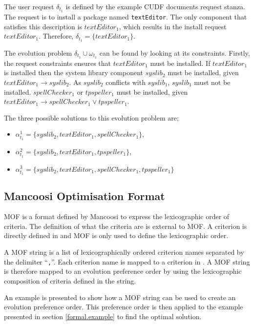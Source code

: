 The user request $\delta_{t_1}$ is defined by the example CUDF documents request stanza.
The request is to install a package named \texttt{textEditor}.
The only component that satisfies this description is $textEditor_1$, which results in the install request $textEditor_1$.
Therefore, $\delta_{t_1} = \{textEditor_1\}$.

The evolution problem $\delta_{t_1} \cup \omega_{t_1}$ can be found by looking at its constraints.
Firstly, the request constraints ensures that $textEditor_1$ must be installed.
If $textEditor_1$ is installed then the system library component $syslib_2$ must be installed, given $textEditor_1 \rightarrow syslib_2$.
As $syslib_2$ conflicts with $syslib_1$, $syslib_1$ must not be installed.
$spellChecker_1$ or $tpspeller_1$ must be installed, given $textEditor_1 \rightarrow spellChecker_1 \vee tpspeller_1$.

The three possible solutions to this evolution problem are;
\begin{itemize}
  \item $\alpha_{t_1}^1 = \{syslib_2, textEditor_1, spellChecker_1\}$,
  \item $\alpha_{t_1}^2 = \{syslib_2, textEditor_1, tpspeller_1\}$,
  \item $\alpha_{t_1}^3 = \{syslib_2, textEditor_1, spellChecker_1, tpspeller_1\}$
\end{itemize}

\subsection{Mancoosi Optimisation Format}
\label{formal.mancoosioptimisationformat}
MOF is a format defined by Mancoosi to express the lexicographic order of criteria.
The definition of what the criteria are is external to MOF.
A criterion is directly defined in \modelname and MOF is only used to define the lexicographic order. 

A MOF string is a list of lexicographically ordered criterion names separated by the delimiter ``\texttt{,}''.
Each criterion name is mapped to a criterion in \modelname.
A MOF string is therefore mapped to an evolution preference order by using the lexicographic composition of criteria defined in the string.

An example is presented to show how a MOF string can be used to create an evolution preference order.
This preference order is then applied to the example presented in section \ref{formal.example} to find the optimal solution.

